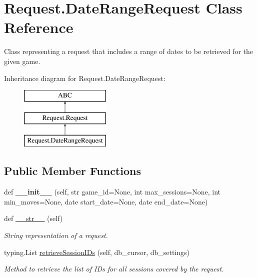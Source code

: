 \hypertarget{class_request_1_1_date_range_request}{}\section{Request.\+Date\+Range\+Request Class Reference}
\label{class_request_1_1_date_range_request}


Class representing a request that includes a range of dates to be retrieved for the given game.  


Inheritance diagram for Request.\+Date\+Range\+Request\+:\begin{figure}[H]
\begin{center}
\leavevmode
\includegraphics[height=3.000000cm]{class_request_1_1_date_range_request}
\end{center}
\end{figure}
\subsection*{Public Member Functions}
\begin{DoxyCompactItemize}
\item 
\mbox{\label{class_request_1_1_date_range_request_ab0c6e3c82af42ad30b607e345bd8e2df}} 
def {\bfseries \+\_\+\+\_\+init\+\_\+\+\_\+} (self, str game\+\_\+id=None, int max\+\_\+sessions=None, int min\+\_\+moves=None, date start\+\_\+date=None, date end\+\_\+date=None)
\item 
def \mbox{\hyperlink{class_request_1_1_date_range_request_a0b6830007ee05d000d2ac4492003a46a}{\+\_\+\+\_\+str\+\_\+\+\_\+}} (self)
\begin{DoxyCompactList}\small\item\em String representation of a request. \end{DoxyCompactList}\item 
typing.\+List \mbox{\hyperlink{class_request_1_1_date_range_request_a6225fcabddc26682a0964b9438d3e845}{retrieve\+Session\+I\+Ds}} (self, db\+\_\+cursor, db\+\_\+settings)
\begin{DoxyCompactList}\small\item\em Method to retrieve the list of I\+Ds for all sessions covered by the request. \end{DoxyCompactList}\end{DoxyCompactItemize}
